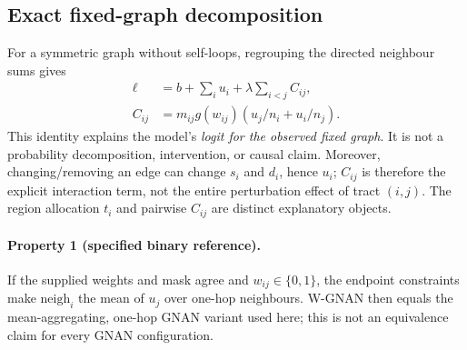 \subsection{Exact fixed-graph decomposition}
For a symmetric graph without self-loops, regrouping the directed neighbour sums gives
\begin{equation}
\label{eq:decomp}
\begin{aligned}
\ell&=b+\sum_i u_i+\lambda\sum_{i<j}C_{ij},\\
C_{ij}&=m_{ij}g(w_{ij})\left(u_j/n_i+u_i/n_j\right).
\end{aligned}
\end{equation}
This identity explains the model's \emph{logit for the observed fixed graph}. It is not a probability
decomposition, intervention, or causal claim. Moreover, changing/removing an edge can change $s_i$
and $d_i$, hence $u_i$; $C_{ij}$ is therefore the explicit interaction term, not the entire
perturbation effect of tract $(i,j)$. The region allocation $t_i$ and pairwise $C_{ij}$ are distinct
explanatory objects.

\paragraph{Property 1 (specified binary reference).} If the supplied weights and mask agree and
$w_{ij}\in\{0,1\}$, the endpoint constraints make $\mathrm{neigh}_i$ the mean of $u_j$ over
one-hop neighbours. W-GNAN then equals the mean-aggregating, one-hop GNAN variant used here; this is
not an equivalence claim for every GNAN configuration.

